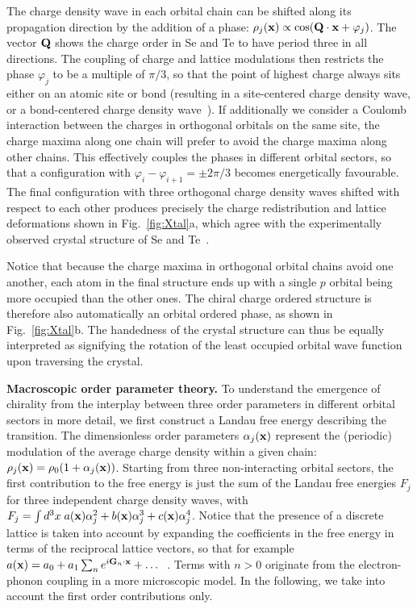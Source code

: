 \documentclass[aps,prl,twocolumn,superscriptaddress,groupedaddress]{revtex4}
\begin{document}
The charge density wave in each orbital chain can be shifted along its propagation direction by the addition of a phase: $\rho_j({\bf x}) \propto \cos({\bf Q} \cdot {\bf x} + \varphi_j)$. The vector ${\bf Q}$ shows the charge order in Se and Te to have period three in all directions. The coupling of charge and lattice modulations then restricts the phase $\varphi_j$ to be a multiple of $\pi/3$, so that the point of highest charge always sits either on an atomic site or bond (resulting in a site-centered charge density wave, or a bond-centered charge density wave~\cite{vandenbrink}). If additionally we consider a Coulomb interaction between the charges in orthogonal orbitals on the same site, the charge maxima along one chain will prefer to avoid the charge maxima along other chains. This effectively couples the phases in different orbital sectors, so that a configuration with $\varphi_i - \varphi_{i+1}  = \pm 2\pi/3$ becomes energetically favourable. The final configuration with three orthogonal charge density waves shifted with respect to each other produces precisely the charge redistribution and lattice deformations shown in Fig.~\ref{fig:Xtal}a, which agree with the experimentally observed crystal structure of Se and Te~\cite{fukutome,vanwezellittlewood}.

Notice that because the charge maxima in orthogonal orbital chains avoid one another, each atom in the final structure ends up with a single $p$ orbital being more occupied than the other ones. The chiral charge ordered structure is therefore also automatically an orbital ordered phase, as shown in Fig.~\ref{fig:Xtal}b. The handedness of the crystal structure can thus be equally interpreted as signifying the rotation of the least occupied orbital wave function upon traversing the crystal.

{\bf Macroscopic order parameter theory.} To understand the emergence of chirality from the interplay between three order parameters in different orbital sectors in more detail, we first construct a Landau free energy describing the transition. The dimensionless order parameters $\alpha_j( {\bf x}) $ represent the (periodic) modulation of the average charge density within a given chain:$\rho_j({\bf x}) = \rho_0 ( 1 + \alpha_j({\bf x}))$. Starting from three non-interacting orbital sectors,  the first contribution to the free energy is just the sum of the Landau free energies $F_j$ for three independent charge density waves, with $F_j= \int d^3 x \; a({\bf x}) \alpha_j^2 + b({\bf x}) \alpha_j^3 + c({\bf x}) \alpha_j^4$. Notice that the presence of a discrete lattice is taken into account by expanding the coefficients in the free energy in terms of the reciprocal lattice vectors, so that for example $a({\bf x}) = a_0 + a_1 \sum_n e^{i {\bf G}_n \cdot {\bf x}}+ \dots$~\cite{mcmillan}. Terms with $n>0$ originate from the electron-phonon coupling in a more microscopic model. In the following, we take into account the first order contributions only.
\end{document}
